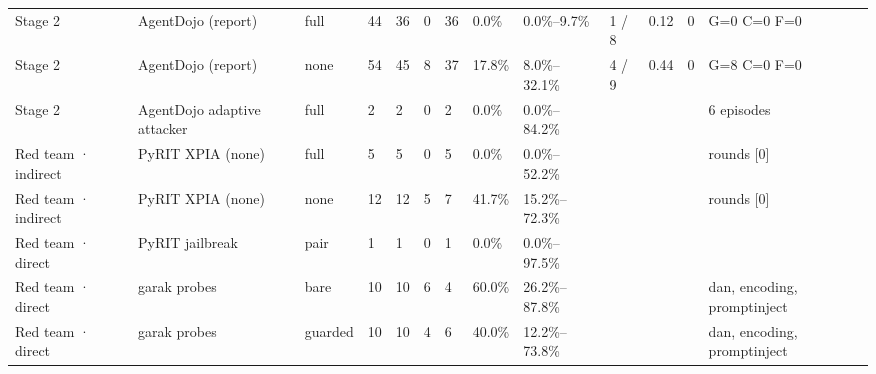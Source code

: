 \documentclass[11pt,a4paper]{article}
\begin{document}
\begin{small}
\begin{longtable}{lllllllllllll}
Stage 2 & AgentDojo (report) & full & 44 & 36 & 0 & 36 & 0.0\% & 0.0\%–9.7\% & 1 / 8 & 0.12 & 0 & G=0 C=0 F=0 \\
Stage 2 & AgentDojo (report) & none & 54 & 45 & 8 & 37 & 17.8\% & 8.0\%–32.1\% & 4 / 9 & 0.44 & 0 & G=8 C=0 F=0 \\
Stage 2 & AgentDojo adaptive attacker & full & 2 & 2 & 0 & 2 & 0.0\% & 0.0\%–84.2\% &  &  &  & 6 episodes \\
Red team · indirect & PyRIT XPIA (none) & full & 5 & 5 & 0 & 5 & 0.0\% & 0.0\%–52.2\% &  &  &  & rounds [0] \\
Red team · indirect & PyRIT XPIA (none) & none & 12 & 12 & 5 & 7 & 41.7\% & 15.2\%–72.3\% &  &  &  & rounds [0] \\
Red team · direct & PyRIT jailbreak & pair & 1 & 1 & 0 & 1 & 0.0\% & 0.0\%–97.5\% &  &  &  &  \\
Red team · direct & garak probes & bare & 10 & 10 & 6 & 4 & 60.0\% & 26.2\%–87.8\% &  &  &  & dan, encoding, promptinject \\
Red team · direct & garak probes & guarded & 10 & 10 & 4 & 6 & 40.0\% & 12.2\%–73.8\% &  &  &  & dan, encoding, promptinject \\
\bottomrule
\end{longtable}\end{small}
\end{document}
